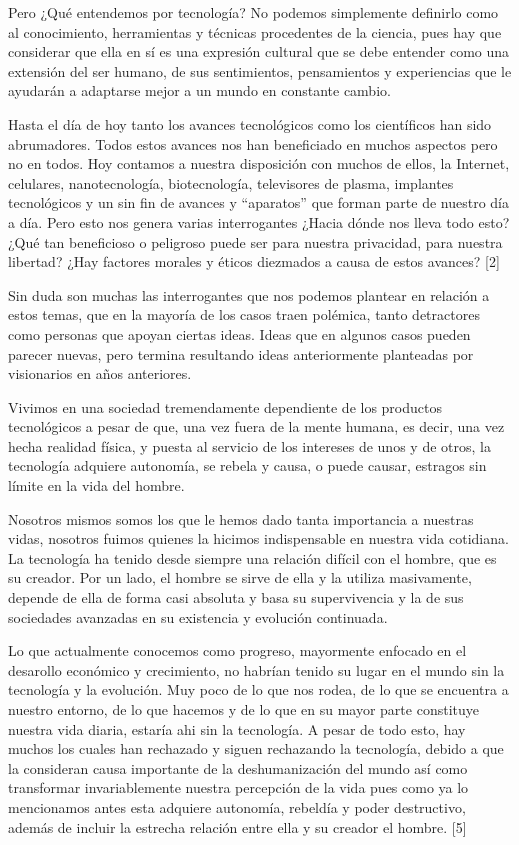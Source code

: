 \documentclass{bmcart}
\begin{document}
Pero ¿Qué entendemos por tecnología? No podemos simplemente definirlo como al conocimiento, herramientas y técnicas procedentes de la ciencia, pues hay que considerar que ella en sí es una expresión cultural que se debe entender como una extensión del ser humano, de sus sentimientos, pensamientos y experiencias que le ayudarán a adaptarse mejor a un mundo en constante cambio.\smallskip

Hasta el día de hoy tanto los avances tecnológicos como los científicos han sido abrumadores. Todos estos avances nos han beneficiado en muchos aspectos pero no en todos. Hoy contamos a nuestra disposición con muchos de ellos, la Internet, celulares, nanotecnología, biotecnología, televisores de plasma, implantes tecnológicos y un sin fin de avances y “aparatos” que forman parte de nuestro día a día. Pero esto nos genera varias interrogantes ¿Hacia dónde nos  lleva todo esto? ¿Qué tan beneficioso o peligroso puede ser para nuestra privacidad, para nuestra libertad? ¿Hay factores morales y éticos diezmados a causa de estos avances? [2]\smallskip

Sin duda son muchas las interrogantes que nos podemos plantear en relación a estos temas, que en la mayoría de los casos traen polémica, tanto detractores como personas que apoyan ciertas ideas. Ideas que en algunos casos pueden parecer nuevas, pero termina resultando ideas anteriormente planteadas por visionarios en años anteriores.\smallskip

Vivimos en una sociedad tremendamente dependiente de los productos tecnológicos a pesar de que, una vez fuera de la mente humana, es decir, una vez hecha realidad física, y puesta al servicio de los intereses de unos y de otros, la tecnología adquiere autonomía, se rebela y causa, o puede causar, estragos sin límite en la vida del hombre.\smallskip

Nosotros mismos somos los que le hemos dado tanta importancia a nuestras vidas, nosotros fuimos quienes la hicimos indispensable en nuestra vida cotidiana. La tecnología ha tenido desde siempre una relación difícil con el hombre, que es su creador. Por un lado, el hombre se sirve de ella y la utiliza masivamente, depende de ella de forma casi absoluta y basa su supervivencia y la de sus sociedades avanzadas en su existencia y evolución continuada. \smallskip

Lo que actualmente conocemos como progreso, mayormente enfocado en el desarollo económico y crecimiento, no habrían tenido su lugar en el mundo sin la tecnología y la evolución. Muy poco de lo que nos rodea, de lo que se encuentra a nuestro entorno, de lo que hacemos y de lo que en su mayor parte constituye nuestra vida diaria, estaría ahi sin la tecnología. A pesar de todo esto, hay muchos los cuales han rechazado y siguen rechazando la tecnología, debido a que la consideran causa importante de la deshumanización del mundo así como transformar invariablemente nuestra percepción de la vida pues como ya lo mencionamos antes esta adquiere autonomía, rebeldía y poder destructivo, además de incluir la estrecha relación entre ella y su creador el hombre. [5]\smallskip
\end{document}
